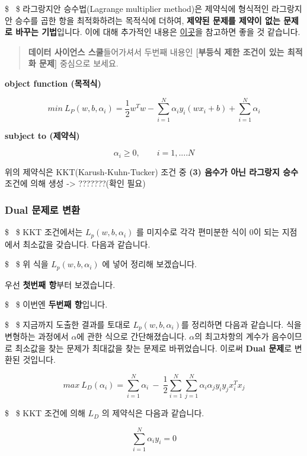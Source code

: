 \documentclass[11pt]{article}
\begin{document}
\$ ~\$ 라그랑지안 승수법(Lagrange multiplier method)은 제약식에 형식적인
라그랑지안 승수를 곱한 항을 최적화하려는 목적식에 더하여, \textbf{제약된
문제를 제약이 없는 문제로 바꾸는 기법}입니다. 이에 대해 추가적인 내용은
\href{https://datascienceschool.net/view-notebook/0c66f1810445488baf19cac79305793b/}{이곳}을
참고하면 좋을 것 같습니다.

\begin{quote}
\textbf{데이터 사이언스 스쿨}들어가셔서 두번째 내용인 \textbf{{[}부등식
제한 조건이 있는 최적화 문제{]}} 중심으로 보세요.
\end{quote}

\textbf{object function (목적식)}

\[
min \ L_P(w,b,\alpha_i) = \frac{1}{2}w^Tw - \sum_{i=1}^N \alpha_i y_i(wx_i+b) + \sum_{i=1}^N \alpha_i 
\]

\textbf{subject to (제약식)}

\[
\alpha_i \ge 0, \qquad i = 1, .... N
\]

위의 제약식은 KKT(Karush-Kuhn-Tucker) 조건 중 \textbf{(3) 음수가 아닌
라그랑지 승수} 조건에 의해 생성 -\textgreater{} ???????(확인 필요)

\subsubsection{Dual 문제로
변환}\label{dual-uxbb38uxc81cuxb85c-uxbcc0uxd658}

\$ ~\$ KKT 조건에서는 \(L_p(w,b,\alpha_i)\) 를 미지수로 각각 편미분한
식이 0이 되는 지점에서 최소값을 갖습니다. 다음과 같습니다.

\$ ~\$ 위 식을 \(L_p(w,b,\alpha_i)\) 에 넣어 정리해 보겠습니다.

우선 \textbf{첫번째 항}부터 보겠습니다.

\$ ~\$ 이번엔 \textbf{두번째 항}입니다.

\$ ~\$ 지금까지 도출한 결과를 토대로 \(L_p(w,b,\alpha_i)\)를 정리하면
다음과 같습니다. 식을 변형하는 과정에서 \(\alpha\)에 관한 식으로
간단해졌습니다. \(\alpha\)의 최고차항의 계수가 음수이므로 최소값을 찾는
문제가 최대값을 찾는 문제로 바뀌었습니다. 이로써 \textbf{Dual 문제}로
변환된 것입니다.

\[
max \ L_D(\alpha_i) = \sum_{i=1}^N \alpha_i \ - \ \frac{1}{2}\sum_{i=1}^N \sum_{j=1}^N \alpha_i\alpha_jy_iy_jx_i^Tx_j
\]

    \$ ~\$ KKT 조건에 의해 \(L_D\) 의 제약식은 다음과 같습니다.

\[
\sum_{i=1}^N \alpha_iy_i = 0
\]
\end{document}
